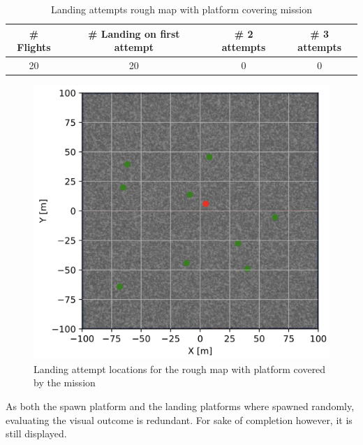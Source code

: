         \begin{table}[h]
            \begin{center}
             \caption{Landing attempts rough map with platform covering mission}\vspace{1ex}
             \label{tab:land_nums_rough_coverage}
             \begin{tabular}{|c|c|c|c|}
             \hline
             \# Flights & \# Landing on first attempt & \# 2 attempts & \# 3 attempts\\ \hline \hline
             20 & 20 & 0 & 0 \\
             \hline
             \end{tabular}
            \end{center}
        \end{table}

        \begin{figure}[h]
        \centering
        \includegraphics[scale=0.5]{images/evaluation/landing_rough_covered.png}
        \caption{Landing attempt locations for the rough map with platform covered by the mission}
        \label{fig:land_rough_covered}
        \end{figure}

        As both the spawn platform and the landing platforms where spawned randomly, evaluating the visual outcome is redundant. For sake of completion however, it is still displayed.

